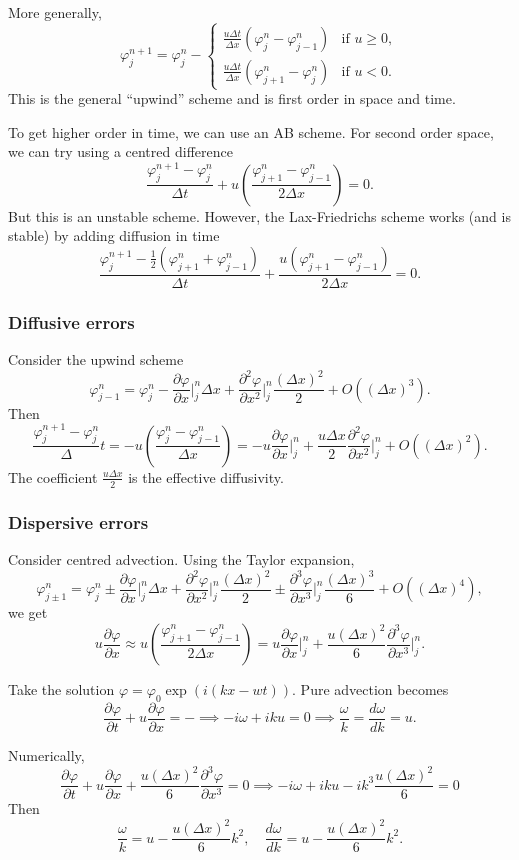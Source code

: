 \documentclass[11pt, a4paper]{article}
\renewcommand{\phi}{\varphi}
\theoremstyle{break}
\newcommand*{\Paren}[1]{\left(#1\right)}%
\newcommand{\dt}{\Delta t}
\newcommand{\dx}{\Delta x}
\newcommand{\der}[2]{\frac{\partial #1}{\partial #2}}
\newcommand{\pder}[3][2]{\frac{\partial^#1 #2}{\partial #3^#1}}
\newcommand{\dder}[2]{\frac{d #1}{d #2}}
\newcommand{\Eval}[1]{\bigg\rvert_{#1}}
\begin{document}
More generally, \[\phi_j^{n+1}=\phi_j^n-\begin{cases}
	\frac{u\dt}{\dx}(\phi_j^n-\phi_{j-1}^n)&\text{if }u\geq0,\\\frac{u\dt}{\dx}(\phi_{j+1}^n-\phi_j^n)&\text{if }u<0.
\end{cases}\] This is the general ``upwind'' scheme and is first order in space and time.

To get higher order in time, we can use an AB scheme. For second order space, we can try using a centred difference 
\[\frac{\phi_j^{n+1}-\phi_j^n}{\dt}+u\Paren{\frac{\phi^n_{j+1}-\phi^n_{j-1}}{2\dx}}=0.\] But this is an unstable scheme. However, the Lax-Friedrichs scheme works (and is stable) by adding diffusion in time \[\frac{\phi_j^{n+1}-\frac12(\phi_{j+1}^n+\phi_{j-1}^n)}{\dt}+{\frac{u(\phi^n_{j+1}-\phi^n_{j-1})}{2\dx}}=0.\]


\subsubsection{Diffusive errors}

Consider the upwind scheme\[\phi_{j-1}^n=\phi_j^n-\der\phi x\Eval j^n\dx+\pder\phi x\Eval j^n\frac{(\dx)^2}2+O((\dx)^3).\] Then \[\frac{\phi_j^{n+1}-\phi_j^n}\dt=-u\Paren{\frac{\phi_j^n-\phi_{j-1}^n}{\dx}}=-u\der\phi x\Eval j^n + \frac{u\dx}2\pder\phi x\Eval j^n + O((\dx)^2).\] The coefficient $\frac{u\dx}2$ is the effective diffusivity.

\subsubsection{Dispersive errors}

Consider centred advection. Using the Taylor expansion, \[\phi_{j\pm 1}^n=\phi_j^n\pm \der\phi x\Eval j^n\dx+\pder\phi x\Eval j^n\frac{(\dx)^2}2\pm \pder[3]\phi x\Eval j^n\frac{(\dx)^3}6+O((\dx)^4),\]
we get \[u\der\phi x \approx u\Paren{\frac{\phi_{j+1}^n-\phi_{j-1}^n}{2\dx}}=u\der\phi x\Eval j^n+\frac{u(\dx)^2}6\pder[3]\phi x\Eval j^n.\]

Take the solution $\phi=\phi_0\exp(i(kx-wt))$. Pure advection becomes \[\der\phi t+u\der\phi x=-\implies -i\omega+iku =0\implies \frac\omega k = \dder\omega k=u.\]

Numerically, \[\der\phi t+ u\der \phi x+\frac{u(\dx)^2}6\pder[3]\phi x=0\implies -i\omega+iku-ik^3\frac{u(\dx)^2}{6}=0\]
Then \[\frac{\omega}k=u-\frac{u(\dx)^2}{6}k^2,\quad \dder\omega k= u -\frac{u(\dx)^2}{6}k^2.\]
\end{document}
